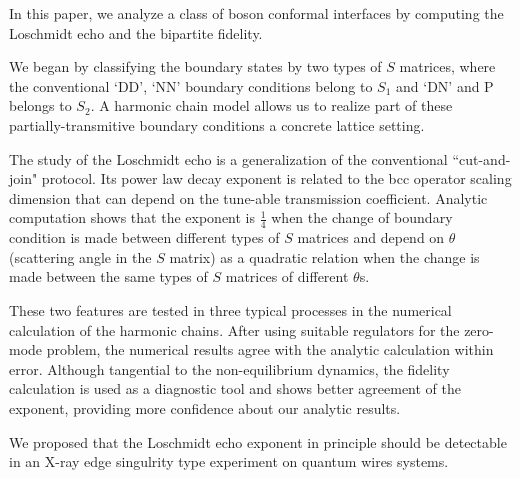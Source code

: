 
In this paper, we analyze a class of boson conformal interfaces by computing the Loschmidt echo and the bipartite fidelity. 

We began by classifying the boundary states by two types of $S$ matrices, where the conventional `DD', `NN' boundary conditions belong to $S_1$ and  `DN' and P belongs to $S_2$. A harmonic chain model allows us to realize part of these partially-transmitive boundary conditions a concrete lattice setting. 

The study of the Loschmidt echo is a generalization of the conventional ``cut-and-join" protocol. Its power law decay exponent is related to the bcc operator scaling dimension that can depend on the tune-able transmission coefficient. Analytic computation shows that the exponent is $\frac{1}{4}$ when the change of boundary condition is made between different types of $S$ matrices and depend on $\theta$ (scattering angle in the $S$ matrix) as a quadratic relation when the change is made between the same types of $S$ matrices of different $\theta$s.

These two features are tested in three typical processes in the numerical calculation of the harmonic chains. After using suitable regulators for the zero-mode problem, the numerical results agree with the analytic calculation within error. Although tangential to the non-equilibrium dynamics, the fidelity calculation is used as a diagnostic tool and shows better agreement of the exponent, providing more confidence about our analytic results. 

We proposed that the Loschmidt echo exponent in principle should be detectable in an X-ray edge singulrity type experiment on quantum wires systems. 



